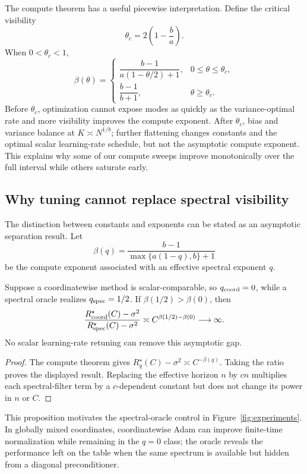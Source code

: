 The compute theorem has a useful piecewise interpretation.  Define the critical visibility
\[
 \theta_c=2\left(1-\frac ba\right).
\]
When $0<\theta_c<1$,
\begin{equation}
\label{eq:phase-transition}
 \beta(\theta)=
 \begin{cases}
 \dfrac{b-1}{a(1-\theta/2)+1}, & 0\le\theta\le\theta_c,\\[7pt]
 \dfrac{b-1}{b+1}, & \theta\ge\theta_c.
 \end{cases}
\end{equation}
Before $\theta_c$, optimization cannot expose modes as quickly as the variance-optimal rate and more visibility improves the compute exponent.  After $\theta_c$, bias and variance balance at $K\asymp N^{1/b}$; further flattening changes constants and the optimal scalar learning-rate schedule, but not the asymptotic compute exponent.  This explains why some of our compute sweeps improve monotonically over the full interval while others saturate early.

\subsection{Why tuning cannot replace spectral visibility}

The distinction between constants and exponents can be stated as an asymptotic separation result.  Let
\[
 \beta(q)=\frac{b-1}{\max\{a(1-q),b\}+1}
\]
be the compute exponent associated with an effective spectral exponent $q$.

\begin{proposition}
\label{prop:oracle-separation}
Suppose a coordinatewise method is scalar-comparable, so $q_{\rm coord}=0$, while a spectral oracle realizes $q_{\rm spec}=1/2$.  If $\beta(1/2)>\beta(0)$, then
\[
 \frac{R^\star_{\rm coord}(C)-\sigma^2}
 {R^\star_{\rm spec}(C)-\sigma^2}
 \asymp C^{\beta(1/2)-\beta(0)}\longrightarrow\infty.
\]
No scalar learning-rate retuning can remove this asymptotic gap.
\end{proposition}

\begin{proof}
The compute theorem gives $R_q^\star(C)-\sigma^2\asymp C^{-\beta(q)}$.  Taking the ratio proves the displayed result.  Replacing the effective horizon $n$ by $cn$ multiplies each spectral-filter term by a $c$-dependent constant but does not change its power in $n$ or $C$.
\end{proof}

This proposition motivates the spectral-oracle control in Figure~\ref{fig:experiments}.  In globally mixed coordinates, coordinatewise Adam can improve finite-time normalization while remaining in the $q=0$ class; the oracle reveals the performance left on the table when the same spectrum is available but hidden from a diagonal preconditioner.

